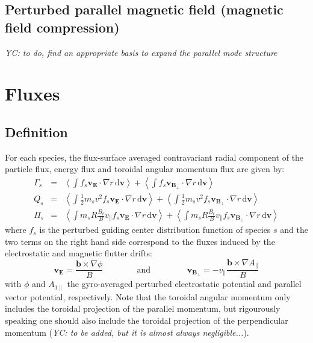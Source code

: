 \documentclass[fleqn]{report}
\begin{document}
\subsection{Perturbed parallel magnetic field (magnetic field compression)}
\textit{YC: to do, find an appropriate basis to expand the parallel mode structure}

\section{Fluxes}
\subsection{Definition}
For each species, the flux-surface averaged contravariant radial component of the particle flux, energy flux and toroidal angular momentum flux are given by:
\begin{eqnarray}
 \Gamma_s &=& \left<\int f_s \mathbf{v}_\mathbf{E} \cdot \nabla r\,\textrm{d}\mathbf{v}\right> 
+ \left<\int f_s \mathbf{v}_{\mathbf{B}_\perp} \cdot \nabla r\,\textrm{d}\mathbf{v}\right> \\
      Q_s &=& \left<\int \frac{1}{2}m_sv^2 f_s \mathbf{v}_\mathbf{E} \cdot \nabla r\,\textrm{d}\mathbf{v}\right> 
+ \left<\int \frac{1}{2}m_sv^2 f_s \mathbf{v}_{\mathbf{B}_\perp} \cdot \nabla r\,\textrm{d}\mathbf{v}\right> \\
  \Pi_s   &=& \left<\int m_s R \frac{B_t}{B}v_\parallel f_s \mathbf{v}_\mathbf{E} \cdot \nabla r\,\textrm{d}\mathbf{v}\right> 
+ \left<\int m_s R \frac{B_t}{B}v_\parallel f_s \mathbf{v}_{\mathbf{B}_\perp} \cdot \nabla r\,\textrm{d}\mathbf{v}\right>
\end{eqnarray}
where $f_s$ is the perturbed guiding center distribution function of species $s$ and the two terms on the right hand side correspond to the fluxes induced by the electrostatic and magnetic flutter drifts:
\begin{equation}
 \mathbf{v}_\mathbf{E} = \frac{\mathbf{b}\times \nabla \phi}{B} \qquad \qquad \textrm{and } \qquad \qquad
 \mathbf{v}_{\mathbf{B}_\perp} = -v_\parallel \frac{\mathbf{b}\times \nabla A_{\parallel}}{B} 
\end{equation}
with $\phi$ and $A_{1\parallel}$ the gyro-averaged perturbed electrostatic potential and  parallel vector potential, respectively.
Note that the toroidal angular momentum only includes the toroidal projection of the parallel momentum, but rigourously speaking one should also include the toroidal projection of the perpendicular momentum (\textit{YC: to be added, but it is almost always negligible...}). 
\end{document}
